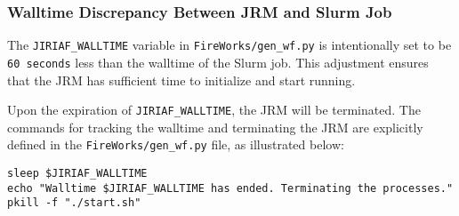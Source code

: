 \subsubsection{Walltime Discrepancy Between JRM and Slurm Job}

The \texttt{JIRIAF\_WALLTIME} variable in \texttt{FireWorks/gen\_wf.py} is intentionally set to be \texttt{60 seconds} less than the walltime of the Slurm job. This adjustment ensures that the JRM has sufficient time to initialize and start running.

Upon the expiration of \texttt{JIRIAF\_WALLTIME}, the JRM will be terminated. The commands for tracking the walltime and terminating the JRM are explicitly defined in the \texttt{FireWorks/gen\_wf.py} file, as illustrated below:

\begin{verbatim}
sleep $JIRIAF_WALLTIME
echo "Walltime $JIRIAF_WALLTIME has ended. Terminating the processes."
pkill -f "./start.sh"
\end{verbatim}
